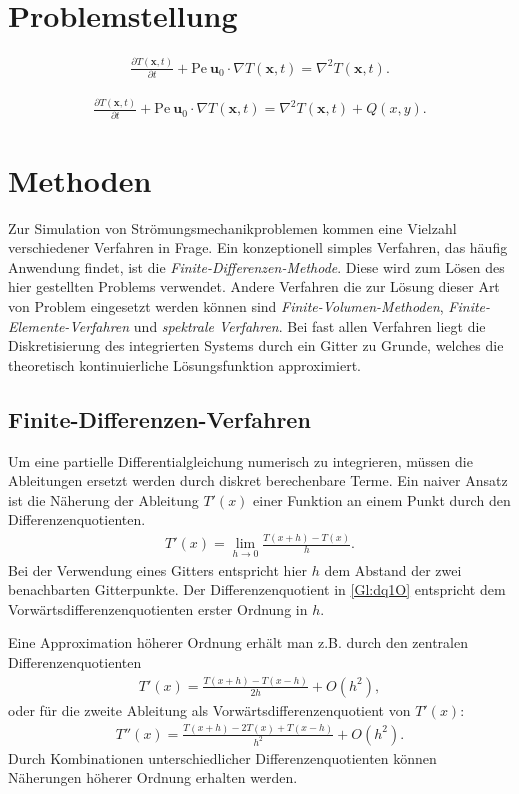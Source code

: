 \section{Problemstellung}

\begin{align}
  \frac{\partial T(\boldsymbol x, t)}{\partial t} + \text{Pe}~ \boldsymbol{u}_0\cdot \nabla T(\boldsymbol x, t) = \nabla^2 T(\boldsymbol x, t). \label{Gl:PDGL}
\end{align}


\begin{align}
  \frac{\partial T(\boldsymbol x, t)}{\partial t} + \text{Pe}~ \boldsymbol{u}_0\cdot \nabla T(\boldsymbol x, t) = \nabla^2 T(\boldsymbol x, t) + Q(x,y). \label{Gl:PDGL_Quell}
\end{align}

\section{Methoden}
Zur Simulation von Strömungsmechanikproblemen kommen eine Vielzahl verschiedener Verfahren in Frage.
Ein konzeptionell simples Verfahren, das häufig Anwendung findet, ist die \emph{Finite-Differenzen-Methode}.
Diese wird zum Lösen des hier gestellten Problems verwendet.
Andere Verfahren die zur Lösung dieser Art von Problem eingesetzt werden können sind \emph{Finite-Volumen-Methoden}, \emph{Finite-Elemente-Verfahren} und \emph{spektrale Verfahren}.
Bei fast allen Verfahren liegt die Diskretisierung des integrierten Systems durch ein Gitter zu Grunde, welches die theoretisch kontinuierliche Lösungsfunktion approximiert.
\subsection{Finite-Differenzen-Verfahren}
Um eine partielle Differentialgleichung numerisch zu integrieren, müssen die Ableitungen ersetzt werden durch diskret berechenbare Terme.
Ein naiver Ansatz ist die Näherung der Ableitung $T'(x)$ einer Funktion an einem Punkt durch den Differenzenquotienten.
\begin{align}
  T'(x) = \lim_{h\rightarrow 0}\frac{T(x+h)-T(x)}{h}.\label{Gl:dq1O}
\end{align}
Bei der Verwendung eines Gitters entspricht hier $h$ dem Abstand der zwei benachbarten Gitterpunkte.
Der Differenzenquotient in \cref{Gl:dq1O} entspricht dem Vorwärtsdifferenzenquotienten erster Ordnung in $h$.

Eine Approximation höherer Ordnung erhält man z.B. durch den zentralen Differenzenquotienten
\begin{align}
  T'(x) = \frac{T(x+h)-T(x-h)}{2h} + O(h^2),\label{Gl:dq2O}
\end{align}
oder für die zweite Ableitung als Vorwärtsdifferenzenquotient von $T'(x)$:
\begin{align}
  T''(x) = \frac{T(x+h)-2T(x)+T(x-h)}{h^2}+O(h^2).\label{Gl:dq2O2Abl}
\end{align}
Durch Kombinationen unterschiedlicher Differenzenquotienten können Näherungen höherer Ordnung erhalten werden.
